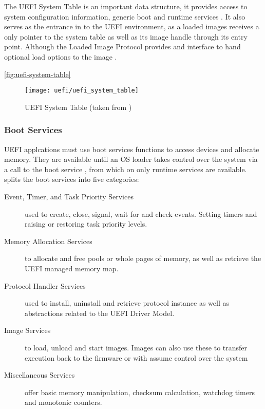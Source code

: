 The UEFI System Table is an important data structure, it provides access to system configuration information, generic boot and runtime services \cite[Section 3.3]{tianocore-edk2-driver-writer-s-guide}.
It also serves as the entrance in to the \ac{UEFI} environment, as a loaded images receives a only pointer to the system table as well as its image handle through its entry point. Although the Loaded Image Protocol provides and interface to hand optional load options to the image \cite{beyond-bios}.

\autoref{fig:uefi-system-table}



\begin{figure}[htb]%
    \centering%
    \texttt{[image: uefi/uefi\_system\_table]}%
    \caption{\ac{UEFI} System Table (taken from \cite[Vol 2, Figure 2-5]{pi-spec})}%
    \label{fig:uefi-system-table}%
\end{figure}


\subsubsection{Boot Services}

\ac{UEFI} applcations must use boot services functions to access devices and allocate memory. They are available until an \ac{OS} loader takes control over the system via a call to the boot service , from which on only runtime services are available. \cite[Section 7]{uefi-spec} splits the boot services into five categories:

\begin{description}
    \item [Event, Timer, and Task Priority Services] used to create, close, signal, wait for and check events. Setting timers and raising or restoring task priority levels.
    \item [Memory Allocation Services] to allocate and free pools or whole pages of memory, as well as retrieve the \ac{UEFI} managed memory map.
    \item [Protocol Handler Services] used to install, uninstall and retrieve protocol instance as well as abstractions related to the \ac{UEFI} Driver Model.
    \item [Image Services] to load, unload and start images. Images can also use these to transfer execution back to the firmware or with  assume control over the system
    \item [Miscellaneous Services] offer basic memory manipulation, checksum calculation, watchdog timers and monotonic counters.
\end{description}

